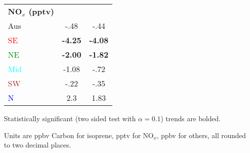 \begin{table}
\begin{threeparttable}
\begin{tabular}{ l | c  c }
            \midrule
            \textbf{NO$_x$ (pptv)}&   & \\
            Aus                   & -.48            & -.44 \\
            \textcolor{red}{SE}   & \textbf{-4.25}  & \textbf{-4.08} \\
            \textcolor{green}{NE} & \textbf{-2.00}  & \textbf{-1.82} \\
            \textcolor{cyan}{Mid} & -1.08           & -.72 \\
            \textcolor{brown}{SW} & -.22           & -.35 \\
            \textcolor{blue}{N}   & 2.3             & 1.83 \\
            \bottomrule
          \end{tabular}
          \begin{tablenotes} 
            \item Statistically significant (two sided test with $\alpha=0.1$) trends are bolded.
            \item Units are ppbv Carbon for isoprene, pptv for NO$_x$, ppbv for others, all rounded to two decimal places.
          \end{tablenotes}
          \label{BioIsop:results:trends:tab_trends}
        \end{threeparttable}\end{table}
      
      
      
      
      
%      
%      

